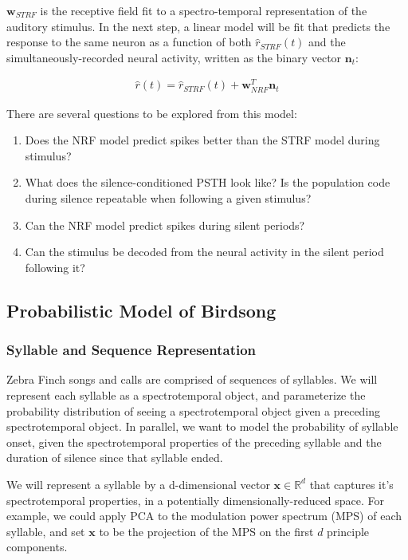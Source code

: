 $\bm{w}_{STRF}$ is the receptive field fit to a spectro-temporal representation of the auditory
stimulus. In the next step, a linear model will be fit that predicts the response to the same
neuron as a function of both $\hat{r}_{STRF}(t)$ and the simultaneously-recorded neural activity,
written as the binary vector $\bm{n}_t$:

\begin{align}
\hat{r}(t) = \hat{r}_{STRF}(t) + \bm{w}_{NRF}^T \bm{n}_t
\end{align}

There are several questions to be explored from this model:

\begin{enumerate}
\item
Does the NRF model predict spikes better than the STRF model during stimulus?
\item
What does the silence-conditioned PSTH look like? Is the population code during silence repeatable
when following a given stimulus?
\item
Can the NRF model predict spikes during silent periods?
\item
Can the stimulus be decoded from the neural activity in the silent period following it?
\end{enumerate}


\subsection{Probabilistic Model of Birdsong}

\subsubsection{Syllable and Sequence Representation}
\label{sec:representation}

Zebra Finch songs and calls are comprised of sequences of syllables. We will
represent each syllable as a spectrotemporal object, and parameterize the probability
distribution of seeing a spectrotemporal object given a preceding spectrotemporal object.
In parallel, we want to model the probability of syllable onset, given the spectrotemporal properties
of the preceding syllable and the duration of silence since that syllable ended.

We will represent a syllable by a d-dimensional vector $\bm{x} \in \mathbb{R}^d$ that captures
it's spectrotemporal properties, in a potentially dimensionally-reduced space. For example, we
could apply PCA to the modulation power spectrum (MPS) of each syllable, and set $\bm{x}$ to be the
projection of the MPS on the first $d$ principle components.

